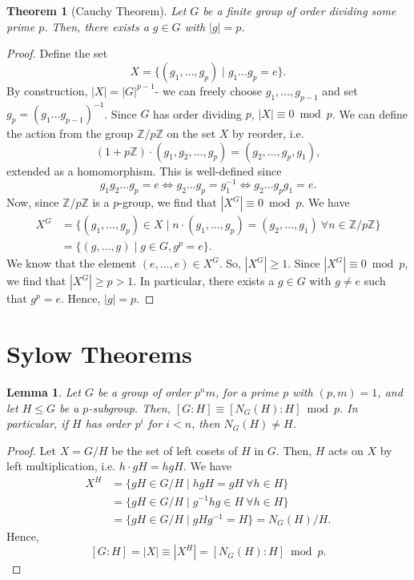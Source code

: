 \documentclass[a4paper, openany]{memoir}
\theoremstyle{definition}
\theoremstyle{plain}
\newtheorem{theorem}[definition]{Theorem}
\newtheorem{lemma}[definition]{Lemma}
\begin{document}
    \begin{theorem}[Cauchy Theorem]
        Let $G$ be a finite group of order dividing some prime $p$. Then, there exists a $g \in G$ with $|g| = p$.
    \end{theorem}
    \begin{proof}
        Define the set
        \[X = \{(g_1, \dots, g_p) \mid g_1 \dots g_p = e\}.\]
        By construction, $|X| = |G|^{p-1}$- we can freely choose $g_1, \dots, g_{p-1}$ and set $g_p = (g_1 \dots g_{p-1})^{-1}$. Since $G$ has order dividing $p$, $|X| \equiv 0 \bmod{p}$. We can define the action from the group $\mathbb{Z}/p\mathbb{Z}$ on the set $X$ by reorder, i.e.
        \[(1 + p\mathbb{Z}) \cdot (g_1, g_2, \dots, g_p) = (g_2, \dots, g_p, g_1),\]
        extended as a homomorphism. This is well-defined since
        \[g_1g_2 \dots g_p = e \iff g_2 \dots g_p = g_1^{-1} \iff g_2 \dots g_p g_1 = e.\]
        Now, since $\mathbb{Z}/p\mathbb{Z}$ is a $p$-group, we find that $|X^G| \equiv 0 \bmod{p}$. We have
        \begin{align*}
            X^G &= \{(g_1, \dots, g_p) \in X \mid  n \cdot (g_1, \dots, g_p) = (g_2, \dots, g_1) \ \forall n \in \mathbb{Z}/p\mathbb{Z} \} \\
            &= \{(g, \dots, g) \mid g \in G, g^p = e\}.
        \end{align*}
        We know that the element $(e, \dots, e) \in X^G$. So, $|X^G| \geq 1$. Since $|X^G| \equiv 0 \bmod{p}$, we find that $|X^G| \geq p > 1$. In particular, there exists a $g \in G$ with $g \neq e$ such that $g^p = e$. Hence, $|g| = p$.
    \end{proof}

    \newpage

    \section{Sylow Theorems}
    \begin{lemma}
        Let $G$ be a group of order $p^nm$, for a prime $p$ with $(p, m) = 1$, and let $H \leq G$ be a $p$-subgroup. Then, $[G:H] \equiv [N_G(H):H] \bmod{p}$. In particular, if $H$ has order $p^i$ for $i < n$, then $N_G(H) \neq H$.
    \end{lemma}
    \begin{proof}
        Let $X = G/H$ be the set of left cosets of $H$ in $G$. Then, $H$ acts on $X$ by left multiplication, i.e. $h \cdot gH = hgH$. We have
        \begin{align*}
            X^H &= \{gH \in G/H \mid hgH = gH \ \forall h \in H\} \\
            &= \{gH \in G/H \mid g^{-1}hg \in H \ \forall h \in H\} \\
            &= \{gH \in G/H \mid gHg^{-1} = H\}= N_G(H)/H.
        \end{align*}
        Hence,
        \[[G:H] = |X| \equiv |X^H| = [N_G(H):H] \bmod{p}.\]
    \end{proof}
\end{document}
